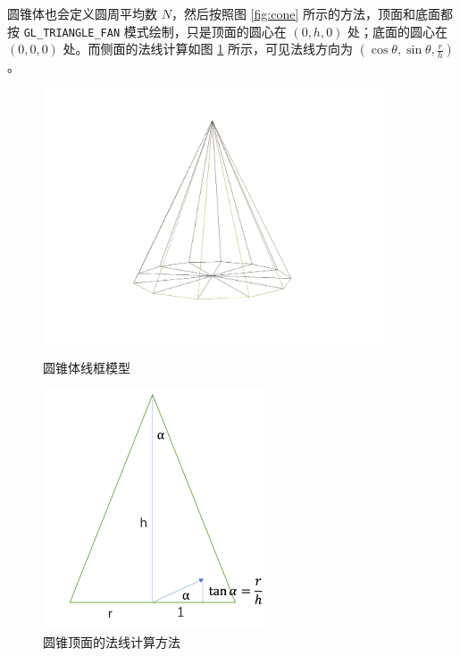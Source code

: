 \documentclass[math-font=newcm]{sjtuarticle}
\begin{document}
圆锥体也会定义圆周平均数 $N$，然后按照图 \ref{fig:cone} 所示的方法，顶面和底面都按 \verb"GL_TRIANGLE_FAN" 模式绘制，只是顶面的圆心在 $(0,h,0)$ 处；底面的圆心在 $(0,0,0)$ 处。而侧面的法线计算如图 \ref{fig:conenorm} 所示，可见法线方向为 $(\cos\theta,\sin\theta,\frac{r}{h})$。

\begin{figure}[h]
    \begin{minipage}{0.45\textwidth}
        \centering
        \includegraphics[width=0.9\textwidth]{cone.png}
        \caption{圆锥体线框模型}
        \label{fig:cone}
    \end{minipage}
    \begin{minipage}{0.45\textwidth}
        \centering
        \includegraphics[width=0.6\textwidth]{conenorm.png}
        \caption{圆锥顶面的法线计算方法}
        \label{fig:conenorm}
    \end{minipage}
\end{figure}
\end{document}
